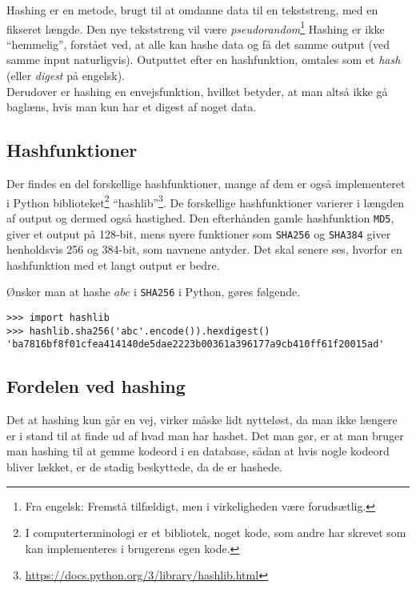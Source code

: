 Hashing er en metode, brugt til at omdanne data til en tekststreng, med en fikseret længde.
Den nye tekststreng vil være \emph{pseudorandom}\footnote{Fra engelsk: Fremstå tilfældigt, men i virkeligheden være forudsætlig.} %
Hashing er ikke ``hemmelig'', forstået ved, at alle kan hashe data og få det samme output (ved samme input naturligvis).
Outputtet efter en hashfunktion, omtales som et \emph{hash} (eller \emph{digest} på engelsk).
\\
Derudover er hashing en envejsfunktion, hvilket betyder, at man altså ikke gå baglæns, hvis man kun har et digest af noget data.\cite{algoritmer}


\subsection{Hashfunktioner}
Der findes en del forskellige hashfunktioner, mange af dem er også implementeret i Python biblioteket\footnote{I computerterminologi er et bibliotek, noget kode, som andre har skrevet som kan implementeres i brugerens egen kode.} ``hashlib''\footnote{\url{https://docs.python.org/3/library/hashlib.html}}.
De forskellige hashfunktioner varierer i længden af output og dermed også hastighed.
Den efterhånden gamle hashfunktion \texttt{MD5}, giver et output på 128-bit, mens nyere funktioner som \texttt{SHA256} og \texttt{SHA384} giver henholdsvis 256 og 384-bit, som navnene antyder.
Det skal senere ses, hvorfor en hashfunktion med et langt output er bedre.

Ønsker man at hashe \(abc\) i \texttt{SHA256} i Python, gøres følgende.
\begin{verbatim}
>>> import hashlib
>>> hashlib.sha256('abc'.encode()).hexdigest()
'ba7816bf8f01cfea414140de5dae2223b00361a396177a9cb410ff61f20015ad'
\end{verbatim}


\subsection{Fordelen ved hashing}
Det at hashing kun går en vej, virker måske lidt nytteløst, da man ikke længere er i stand til at finde ud af hvad man har hashet.
Det man gør, er at man bruger man hashing til at gemme kodeord i en database, sådan at hvis nogle kodeord bliver lækket, er de stadig beskyttede, da de er hashede.

